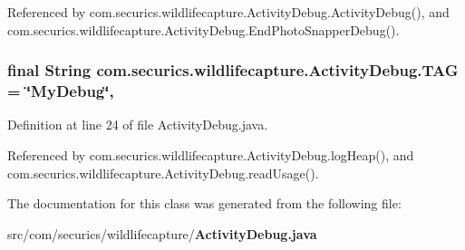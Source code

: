 Referenced by com.\+securics.\+wildlifecapture.\+Activity\+Debug.\+Activity\+Debug(), and com.\+securics.\+wildlifecapture.\+Activity\+Debug.\+End\+Photo\+Snapper\+Debug().

\subsubsection[{T\+A\+G}]{\setlength{\rightskip}{0pt plus 5cm}final String com.\+securics.\+wildlifecapture.\+Activity\+Debug.\+T\+A\+G = \char`\"{}My\+Debug\char`\"{}\hspace{0.3cm}{\ttfamily [static]}, {\ttfamily [private]}}\label{classcom_1_1securics_1_1wildlifecapture_1_1_activity_debug_a10a4ded4877417f6eac32a0fc0193d1f}


Definition at line 24 of file Activity\+Debug.\+java.



Referenced by com.\+securics.\+wildlifecapture.\+Activity\+Debug.\+log\+Heap(), and com.\+securics.\+wildlifecapture.\+Activity\+Debug.\+read\+Usage().



The documentation for this class was generated from the following file\+:\begin{DoxyCompactItemize}
\item 
src/com/securics/wildlifecapture/{\bf Activity\+Debug.\+java}\end{DoxyCompactItemize}
